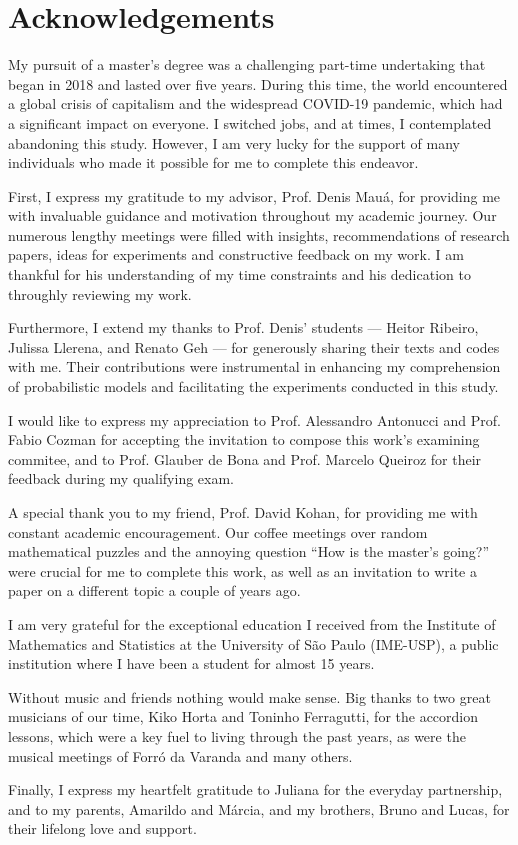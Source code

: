 \chapter*{Acknowledgements}

My pursuit of a master's degree was a challenging part-time undertaking that began in 2018 and lasted over five years. During this time, the world encountered a global crisis of capitalism and the widespread COVID-19 pandemic, which had a significant impact on everyone. I switched jobs, and at times, I contemplated abandoning this study. However, I am very lucky for the support of many individuals who made it possible for me to complete this endeavor.

First, I express my gratitude to my advisor, Prof. Denis Mauá, for providing me with invaluable guidance and motivation throughout my academic journey. Our numerous lengthy meetings were filled with insights, recommendations of research papers, ideas for experiments and constructive feedback on my work. I am thankful for his understanding of my time constraints and his dedication to throughly reviewing my work.

Furthermore, I extend my thanks to Prof. Denis' students --- Heitor Ribeiro, Julissa Llerena, and Renato Geh --- for generously sharing their texts and codes with me. Their contributions were instrumental in enhancing my comprehension of probabilistic models and facilitating the experiments conducted in this study.

I would like to express my appreciation to Prof. Alessandro Antonucci and Prof. Fabio Cozman for accepting the invitation to compose this work's examining commitee, and to Prof. Glauber de Bona and Prof. Marcelo Queiroz for their feedback during my qualifying exam.

A special thank you to my friend, Prof. David Kohan, for providing me with constant academic encouragement. Our coffee meetings over random mathematical puzzles and the annoying question ``How is the master's going?'' were crucial for me to complete this work, as well as an invitation to write a paper on a different topic a couple of years ago.

I am very grateful for the exceptional education I received from the Institute of Mathematics and Statistics at the University of São Paulo (IME-USP), a public institution where I have been a student for almost 15 years.

Without music and friends nothing would make sense. Big thanks to two great musicians of our time, Kiko Horta and Toninho Ferragutti, for the accordion lessons, which were a key fuel to living through the past years, as were the musical meetings of Forró da Varanda and many others.

Finally, I express my heartfelt gratitude to Juliana for the everyday partnership, and to my parents, Amarildo and Márcia, and my brothers, Bruno and Lucas, for their lifelong love and support.
